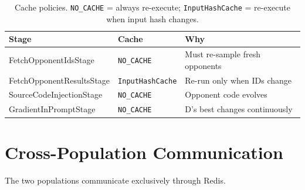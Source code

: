 \documentclass[11pt,a4paper]{article}
\begin{document}
\begin{table}[H]
\centering\small
\begin{tabular}{@{}lll@{}}
\toprule
\textbf{Stage} & \textbf{Cache} & \textbf{Why} \\
\midrule
FetchOpponentIdsStage & \texttt{NO\_CACHE} & Must re-sample fresh opponents \\
FetchOpponentResultsStage & \texttt{InputHashCache} & Re-run only when IDs change \\
SourceCodeInjectionStage & \texttt{NO\_CACHE} & Opponent code evolves \\
GradientInPromptStage & \texttt{NO\_CACHE} & D's best changes continuously \\
\bottomrule
\end{tabular}
\caption{Cache policies. \texttt{NO\_CACHE} = always re-execute; \texttt{InputHashCache} = re-execute when input hash changes.}
\end{table}

\section{Cross-Population Communication}

The two populations communicate exclusively through Redis.
\end{document}
